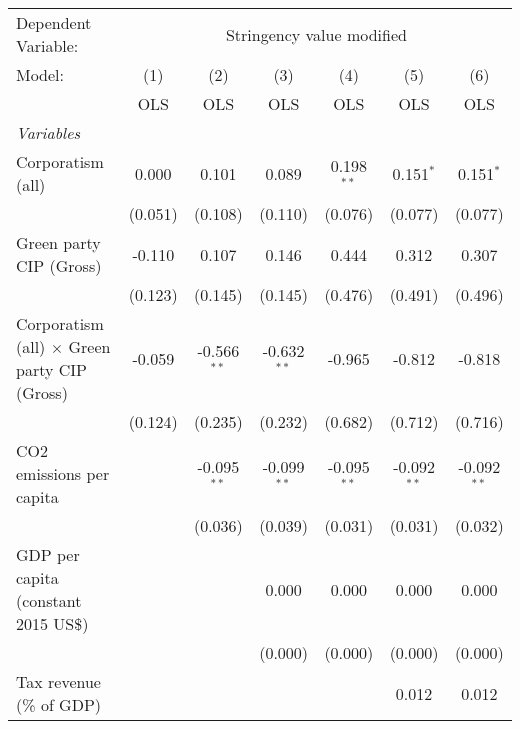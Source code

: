 
\begingroup
\centering
\begin{tabular}{lcccccc}
   \toprule
   Dependent Variable: & \multicolumn{6}{c}{Stringency value modified}\\
   Model:                                              & (1)     & (2)           & (3)           & (4)           & (5)           & (6)\\  
                                                       &  OLS    & OLS           & OLS           & OLS           & OLS           & OLS\\  
   \midrule
   \emph{Variables}\\
   Corporatism (all)                                   & 0.000   & 0.101         & 0.089         & 0.198$^{**}$  & 0.151$^{*}$   & 0.151$^{*}$\\   
                                                       & (0.051) & (0.108)       & (0.110)       & (0.076)       & (0.077)       & (0.077)\\   
   Green party CIP (Gross)                             & -0.110  & 0.107         & 0.146         & 0.444         & 0.312         & 0.307\\   
                                                       & (0.123) & (0.145)       & (0.145)       & (0.476)       & (0.491)       & (0.496)\\   
   Corporatism (all) $\times$ Green party CIP (Gross)  & -0.059  & -0.566$^{**}$ & -0.632$^{**}$ & -0.965        & -0.812        & -0.818\\   
                                                       & (0.124) & (0.235)       & (0.232)       & (0.682)       & (0.712)       & (0.716)\\   
   CO2 emissions per capita                            &         & -0.095$^{**}$ & -0.099$^{**}$ & -0.095$^{**}$ & -0.092$^{**}$ & -0.092$^{**}$\\   
                                                       &         & (0.036)       & (0.039)       & (0.031)       & (0.031)       & (0.032)\\   
   GDP per capita (constant 2015 US\$)                 &         &               & 0.000         & 0.000         & 0.000         & 0.000\\   
                                                       &         &               & (0.000)       & (0.000)       & (0.000)       & (0.000)\\   
   Tax revenue (\% of GDP)                             &         &               &               &               & 0.012         & 0.012\\   

\end{tabular}
